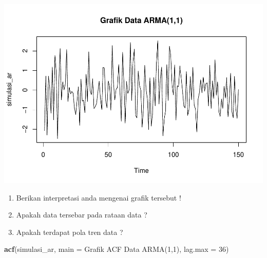 \documentclass[
]{book}
\newenvironment{Shaded}{\begin{snugshade}}{\end{snugshade}}
\newcommand{\AttributeTok}[1]{\textcolor[rgb]{0.13,0.29,0.53}{#1}}
\newcommand{\DecValTok}[1]{\textcolor[rgb]{0.00,0.00,0.81}{#1}}
\newcommand{\FunctionTok}[1]{\textcolor[rgb]{0.13,0.29,0.53}{\textbf{#1}}}
\newcommand{\NormalTok}[1]{#1}
\newcommand{\StringTok}[1]{\textcolor[rgb]{0.31,0.60,0.02}{#1}}
\begin{document}
\begin{center}\includegraphics{_main_files/figure-latex/Model ARMA-1} \end{center}
\begin{jp}{}{}
\begin{enumerate}
\item Berikan interpretasi anda mengenai grafik tersebut !  
\item Apakah data tersebar pada rataan data ?  
\item Apakah terdapat pola tren data ?
\end{enumerate}
\end{jp}

\begin{Shaded}
\begin{Highlighting}[]
\FunctionTok{acf}\NormalTok{(simulasi\_ar, }\AttributeTok{main =} \StringTok{\textquotesingle{}Grafik ACF Data ARMA(1,1)\textquotesingle{}}\NormalTok{, }
  \AttributeTok{lag.max =} \DecValTok{36}\NormalTok{)}
\end{Highlighting}
\end{Shaded}
\end{document}
